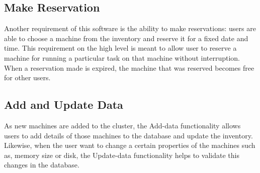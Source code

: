 \subsection{Make Reservation}\label{makereserve}
Another requirement of this software is the ability to make reservations: users are able to choose a machine from the inventory and reserve it for a fixed date and time. This requirement on the high level is meant to allow user to reserve a machine for running a particular task on that machine without interruption. When a reservation made is expired, the machine that was reserved becomes free for other users. 
\subsection{Add and Update Data} \label{addmachines}
As new machines are added to the cluster, the Add-data functionality allows users to add details of those machines to the database and update the inventory. Likewise, when the user want to change a certain properties of the machines such as, memory size or disk, the Update-data functionality helps to validate  this changes in the database.

